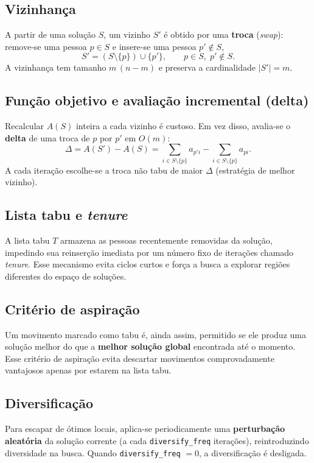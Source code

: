 \documentclass[a4paper,11pt]{article}
\begin{document}
\subsection{Vizinhança}
A partir de uma solução $S$, um vizinho $S'$ é obtido por uma \textbf{troca} (\emph{swap}):
remove-se uma pessoa $p \in S$ e insere-se uma pessoa $p' \notin S$,
\begin{equation*}
  S' = (S \setminus \{p\}) \cup \{p'\}, \qquad p \in S,\; p' \notin S.
\end{equation*}
A vizinhança tem tamanho $m\,(n-m)$ e preserva a cardinalidade $|S'| = m$.

\subsection{Função objetivo e avaliação incremental (delta)}
Recalcular $A(S)$ inteira a cada vizinho é custoso. Em vez disso, avalia-se o
\textbf{delta} de uma troca de $p$ por $p'$ em $O(m)$:
\begin{equation}
  \Delta = A(S') - A(S)
         = \sum_{i \in S \setminus \{p\}} a_{p'i}
         - \sum_{i \in S \setminus \{p\}} a_{pi}.
  \label{eq:delta}
\end{equation}
A cada iteração escolhe-se a troca não tabu de maior $\Delta$ (estratégia de melhor
vizinho).

\subsection{Lista tabu e \emph{tenure}}
A lista tabu $T$ armazena as pessoas recentemente removidas da solução, impedindo sua
reinserção imediata por um número fixo de iterações chamado \emph{tenure}. Esse mecanismo
evita ciclos curtos e força a busca a explorar regiões diferentes do espaço de soluções.

\subsection{Critério de aspiração}
Um movimento marcado como tabu é, ainda assim, permitido se ele produz uma solução melhor
do que a \textbf{melhor solução global} encontrada até o momento. Esse critério de
aspiração evita descartar movimentos comprovadamente vantajosos apenas por estarem na
lista tabu.

\subsection{Diversificação}
Para escapar de ótimos locais, aplica-se periodicamente uma \textbf{perturbação aleatória}
da solução corrente (a cada \texttt{diversify\_freq} iterações), reintroduzindo
diversidade na busca. Quando \texttt{diversify\_freq} $= 0$, a diversificação é desligada.
\end{document}
